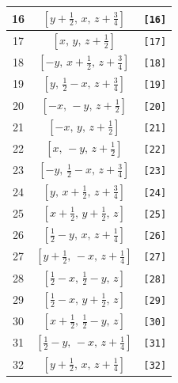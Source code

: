 \documentclass[fleqn,8pt]{jsarticle}
\begin{document}
\begin{longtable}{ccc}
16 & $\left[ y + \frac{1}{2},\, x,\, z + \frac{3}{4} \right]$ & {\tt [16]} \\ \hline
17 & $\left[ x,\, y,\, z + \frac{1}{2} \right]$ & {\tt [17]} \\ \hline
18 & $\left[ - y,\, x + \frac{1}{2},\, z + \frac{3}{4} \right]$ & {\tt [18]} \\ \hline
19 & $\left[ y,\, \frac{1}{2} - x,\, z + \frac{3}{4} \right]$ & {\tt [19]} \\ \hline
20 & $\left[ - x,\, - y,\, z + \frac{1}{2} \right]$ & {\tt [20]} \\ \hline
21 & $\left[ - x,\, y,\, z + \frac{1}{2} \right]$ & {\tt [21]} \\ \hline
22 & $\left[ x,\, - y,\, z + \frac{1}{2} \right]$ & {\tt [22]} \\ \hline
23 & $\left[ - y,\, \frac{1}{2} - x,\, z + \frac{3}{4} \right]$ & {\tt [23]} \\ \hline
24 & $\left[ y,\, x + \frac{1}{2},\, z + \frac{3}{4} \right]$ & {\tt [24]} \\ \hline
25 & $\left[ x + \frac{1}{2},\, y + \frac{1}{2},\, z \right]$ & {\tt [25]} \\ \hline
26 & $\left[ \frac{1}{2} - y,\, x,\, z + \frac{1}{4} \right]$ & {\tt [26]} \\ \hline
27 & $\left[ y + \frac{1}{2},\, - x,\, z + \frac{1}{4} \right]$ & {\tt [27]} \\ \hline
28 & $\left[ \frac{1}{2} - x,\, \frac{1}{2} - y,\, z \right]$ & {\tt [28]} \\ \hline
29 & $\left[ \frac{1}{2} - x,\, y + \frac{1}{2},\, z \right]$ & {\tt [29]} \\ \hline
30 & $\left[ x + \frac{1}{2},\, \frac{1}{2} - y,\, z \right]$ & {\tt [30]} \\ \hline
31 & $\left[ \frac{1}{2} - y,\, - x,\, z + \frac{1}{4} \right]$ & {\tt [31]} \\ \hline
32 & $\left[ y + \frac{1}{2},\, x,\, z + \frac{1}{4} \right]$ & {\tt [32]} \\
\end{longtable}
\end{document}
